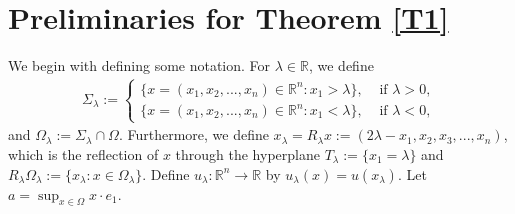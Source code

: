 \documentclass[11pt, notitlepage]{article}
\def\R{\mathbb{R}}
\begin{document}
{\section{Preliminaries for Theorem \ref{T1}}
We begin with defining some notation. For $\lambda\in\R$, we define 
\begin{align}\label{M}
    \Sigma_\lambda:=\begin{cases}
        \{x=(x_1,x_2,...,x_n)\in \R^{n}: x_1>\lambda\}, &\text{ if }\lambda>0,\\
        \{x=(x_1,x_2,...,x_n)\in \R^{n}: x_1<\lambda\}, &\text{ if }\lambda<0,
    \end{cases}
\end{align}
and $\Omega_\lambda:=\Sigma_\lambda\cap\Omega.$ Furthermore, we define $x_\lambda=R_\lambda x:=(2\lambda-x_1,x_2,x_3,...,x_n)$, which is the reflection of $x$ through the hyperplane $T_\lambda:=\{x_1=\lambda\}$ and $R_\lambda\Omega_\lambda:=\{x_\lambda: x\in\Omega_\lambda\}$. Define $u_\lambda:\R^n\to \R$ by $u_\lambda(x)=u(x_\lambda)$. Let $a=\sup_{x\in\Omega} x\cdot e_1$.

}
\end{document}
